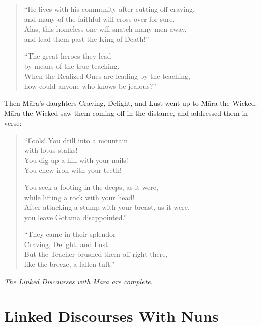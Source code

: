 \documentclass[12pt,openany]{book}%
\let\oldcontentsline\contentsline
\newcommand{\nopagecontentsline}[3]{\oldcontentsline{#1}{#2}{}}
\newcommand*{\scendsutta}[1]{\begin{center}\textit{#1}\end{center}}
\begin{document}
\begin{verse}%
“He lives with his community after cutting off craving, \\
and many of the faithful will cross over for sure. \\
Alas, this homeless one will snatch many men away, \\
and lead them past the King of Death!” 

“The great heroes they lead \\
by means of the true teaching. \\
When the Realized Ones are leading by the teaching, \\
how could anyone who knows be jealous?” 

%
\end{verse}

Then \textsanskrit{Māra}’s daughters Craving, Delight, and Lust went up to \textsanskrit{Māra} the Wicked. \textsanskrit{Māra} the Wicked saw them coming off in the distance, and addressed them in verse: 

\begin{verse}%
“Fools! You drill into a mountain \\
with lotus stalks! \\
You dig up a hill with your nails! \\
You chew iron with your teeth! 

You seek a footing in the deeps, as it were, \\
while lifting a rock with your head! \\
After attacking a stump with your breast, as it were, \\
you leave Gotama disappointed.” 

“They came in their splendor—\\
Craving, Delight, and Lust. \\
But the Teacher brushed them off right there, \\
like the breeze, a fallen tuft.” 

%
\end{verse}

\scendsutta{The Linked Discourses with \textsanskrit{Māra} are complete. }

%
\part*{Linked Discourses With Nuns}
\markboth{}{}
\addtocontents{toc}{\let\protect\contentsline\protect\oldcontentsline}
\end{document}
